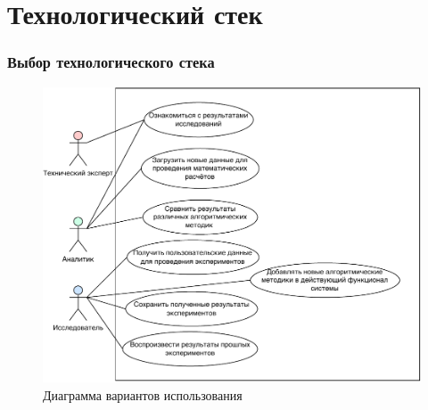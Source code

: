 \section{Технологический стек}

\begin{frame}
\frametitle{Выбор технологического стека}
\begin{figure}
    \includegraphics[scale=.48]{pictures/usecase}
    \caption{Диаграмма вариантов использования}
\end{figure}
\end{frame}
